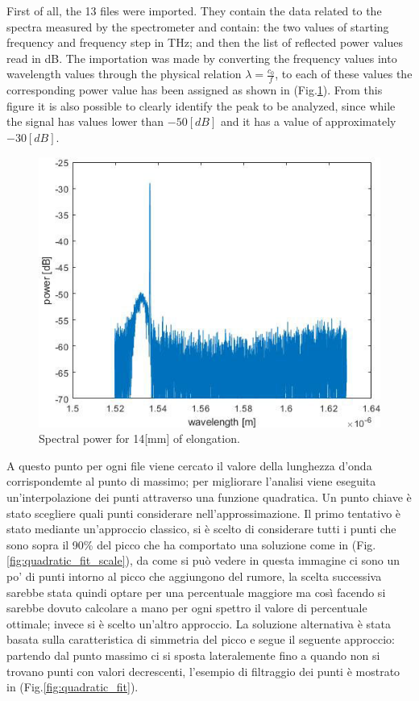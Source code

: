 \newpage
{}
First of all, the 13 files were imported. They contain the data related to the spectra measured by the spectrometer and contain: the two values of starting frequency and frequency step in THz; and then the list of reflected power values read in dB. The importation was made by converting the frequency values into wavelength values through the physical relation $\lambda = \frac{c_0}{f}$, to each of these values the corresponding power value has been assigned as shown in (Fig.\ref{fig:spectralPower}). From this figure it is also possible to clearly identify the peak to be analyzed, since while the signal has values lower than $-50[dB]$ and it has a value of approximately $-30[dB]$.
\begin{figure}[h]
    \centering
    \includegraphics[scale=0.7]{img/spectralPower.jpg}
    \caption{Spectral power for 14[mm] of elongation.}
    \label{fig:spectralPower}
\end{figure}
A questo punto per ogni file viene cercato il valore della lunghezza d'onda corrispondemte al punto di massimo; per migliorare l'analisi viene eseguita un'interpolazione dei punti attraverso una funzione quadratica. Un punto chiave è stato scegliere quali punti considerare nell'approssimazione. Il primo tentativo è stato mediante un'approccio classico, si è scelto di considerare tutti i punti che sono sopra il 90\% del picco che ha comportato una soluzione come in (Fig.\ref{fig:quadratic_fit_scale}), da come si può vedere in questa immagine ci sono un po' di punti intorno al picco che aggiungono del rumore, la scelta successiva sarebbe stata quindi optare per una percentuale maggiore ma così facendo si sarebbe dovuto calcolare a mano per ogni spettro il valore di percentuale ottimale; invece si è scelto un'altro approccio. La soluzione alternativa è stata basata sulla caratteristica di simmetria del picco e segue il seguente approccio: partendo dal punto massimo ci si sposta lateralemente fino a quando non si trovano punti con valori decrescenti, l'esempio di filtraggio dei punti è mostrato in (Fig.\ref{fig:quadratic_fit}).

